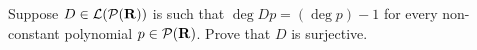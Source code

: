 \begin{exercise}
    Suppose $D \in \mathcal{L}(\mathcal{P}(\mathbf{R}))$ is such that $\deg Dp = (\deg p) - 1$ for every non-constant polynomial $p \in \mathcal{P}(\mathbf{R})$. Prove that $D$ is surjective. \\
\end{exercise}

\begin{solution}
    \\ \td \\
\end{solution}

\begin{exercise}
    \td \\
\end{exercise}

\begin{solution}
    \\ \td \\
\end{solution}

\begin{exercise}
    \td \\
\end{exercise}

\begin{solution}
    \\ \td \\
\end{solution}

\begin{exercise}
    \td \\
\end{exercise}

\begin{solution}
    \\ \td \\
\end{solution}

\begin{exercise}
    \td \\
\end{exercise}

\begin{solution}
    \\ \td \\
\end{solution}

\begin{exercise}
    \td \\
\end{exercise}

\begin{solution}
    \\ \td \\
\end{solution}
